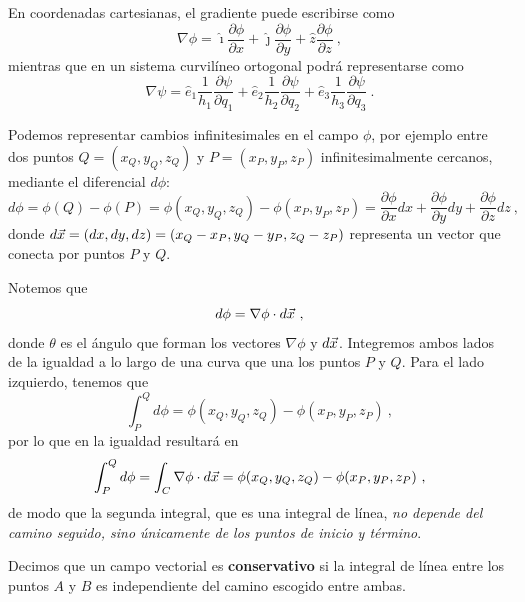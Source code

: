 En coordenadas cartesianas, el gradiente puede escribirse como 
\begin{equation}
    \nabla \phi = \hat{\imath} \frac{\partial \phi}{\partial x} + \hat{\jmath} \frac{\partial \phi}{\partial y} + \hat{z} \frac{\partial \phi}{\partial z} \ ,
\end{equation}
mientras que en un sistema curvilíneo ortogonal podrá representarse como 
\begin{equation}
    \nabla \psi = \hat{e}_1 \frac{1}{h_1} \frac{\partial \psi}{\partial q_1} + \hat{e}_2 \frac{1}{h_2} \frac{\partial \psi}{\partial q_2} + \hat{e}_3 \frac{1}{h_3} \frac{\partial \psi}{\partial q_3} \ .
\end{equation}

Podemos representar cambios infinitesimales en el campo $\phi$, por ejemplo entre dos puntos $Q = (x_Q, y_Q, z_Q)$ y $P = (x_P, y_P, z_P)$ infinitesimalmente cercanos, mediante el diferencial $d\phi$:
\begin{equation*}
    d\phi = \phi(Q) - \phi(P) = \phi(x_Q, y_Q, z_Q) - \phi(x_P, y_P, z_P) = \frac{\partial \phi}{\partial x} dx + \frac{\partial \phi}{\partial y} dy + \frac{\partial \phi}{\partial z} dz \ ,
\end{equation*}
donde $d\vec{x} = (dx, dy, dz) = (x_Q - x_P, y_Q - y_P, z_Q - z_P)$ representa un vector que conecta por puntos $P$ y $Q$.

Notemos que 
\begin{equation*}
    d\phi = \nabla \phi \cdot d\vec{x} \ ,
\end{equation*}
donde $\theta$ es el ángulo que forman los vectores $\nabla \phi$ y $d\vec{x}$. Integremos ambos lados de la igualdad a lo largo de una curva que una los puntos $P$ y $Q$. Para el lado izquierdo, tenemos que
\begin{equation*}
    \int_P^Q d\phi = \phi(x_Q, y_Q, z_Q) - \phi(x_P, y_P, z_P) \ ,
\end{equation*}
por lo que en la igualdad resultará en 
\begin{equation}
    \int_P^Q d\phi = \int_C \nabla \phi \cdot d\vec{x} = \phi(x_Q, y_Q, z_Q) - \phi(x_P, y_P, z_P) \ ,
\end{equation}
de modo que la segunda integral, que es una integral de línea, \emph{no depende del camino seguido, sino únicamente de los puntos de inicio y término}.

\begin{defi}
    Decimos que un campo vectorial es \textbf{conservativo} si la integral de línea entre los puntos $A$ y $B$ es independiente del camino escogido entre ambas.
\end{defi}

